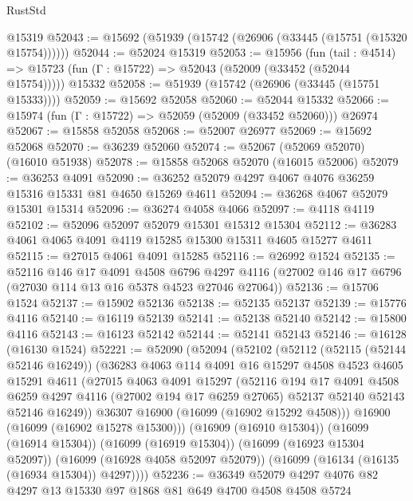 \begin{lexlean}{RustStd}
\begin{coremodule}
    @15319
@52043 := @15692 (@51939 (@15742 (@26906 (@33445 (@15751 (@15320 @15754))))))
@52044 := @52024 @15319
@52053 := @15956
    (fun (tail : @4514) => @15723 (fun (Γ : @15722) => @52043 (@52009 (@33452 (@52044 @15754)))))
    @15332
@52058 := @51939 (@15742 (@26906 (@33445 (@15751 @15333))))
@52059 := @15692 @52058
@52060 := @52044 @15332
@52066 := @15974 (fun (Γ : @15722) => @52059 (@52009 (@33452 @52060))) @26974
@52067 := @15858 @52058
@52068 := @52007 @26977
@52069 := @15692 @52068
@52070 := @36239 @52060
@52074 := @52067 (@52069 @52070) (@16010 @51938)
@52078 := @15858 @52068 @52070 (@16015 @52006)
@52079 := @36253 @4091
@52090 := @36252 @52079 @4297 @4067 @4076 @36259 @15316 @15331 @81 @4650 @15269 @4611
@52094 := @36268 @4067 @52079 @15301 @15314
@52096 := @36274 @4058 @4066
@52097 := @4118 @4119
@52102 := @52096 @52097 @52079 @15301 @15312 @15304
@52112 := @36283 @4061 @4065 @4091 @4119 @15285 @15300 @15311 @4605 @15277 @4611
@52115 := @27015 @4061 @4091 @15285
@52116 := @26992 @1524
@52135 := @52116
    @146
    @17
    @4091
    @4508
    @6796
    @4297
    @4116
    (@27002 @146 @17 @6796 (@27030 @114 @13 @16 @5378 @4523 @27046 @27064))
@52136 := @15706 @1524
@52137 := @15902 @52136
@52138 := @52135 @52137
@52139 := @15776 @4116
@52140 := @16119 @52139
@52141 := @52138 @52140
@52142 := @15800 @4116
@52143 := @16123 @52142
@52144 := @52141 @52143
@52146 := @16128 (@16130 @1524)
@52221 := @52090
    (@52094
      (@52102
        (@52112
          (@52115 (@52144 @52146 @16249))
          (@36283
            @4063
            @114
            @4091
            @16
            @15297
            @4508
            @4523
            @4605
            @15291
            @4611
            (@27015
              @4063
              @4091
              @15297
              (@52116
                @194
                @17
                @4091
                @4508
                @6259
                @4297
                @4116
                (@27002 @194 @17 @6259 @27065)
                @52137
                @52140
                @52143
                @52146
                @16249))
            @36307
            @16900
            (@16099 (@16902 @15292 @4508)))
          @16900
          (@16099 (@16902 @15278 @15300)))
        (@16909 (@16910 @15304))
        (@16099 (@16914 @15304))
        (@16099 (@16919 @15304))
        (@16099 (@16923 @15304 @52097))
        (@16099 (@16928 @4058 @52097 @52079))
        (@16099 (@16134 (@16135 (@16934 @15304)) @4297))))
@52236 := @36349 @52079 @4297 @4076 @82 @4297 @13 @15330 @97 @1868 @81 @649 @4700 @4508 @4508 @5724

\end{coremodule}
\end{lexlean}
